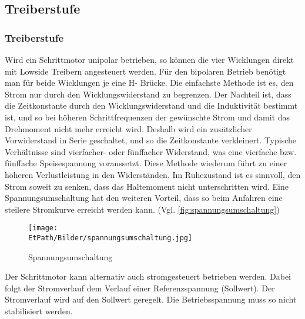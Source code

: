 \ifSTANDALONE
\subsection{Treiberstufe}
\fi
\ifEMBED
\subsubsection{Treiberstufe}
\fi 
	Wird ein Schrittmotor unipolar betrieben, so können die vier Wicklungen 
    direkt mit Lowside Treibern angesteuert werden. Für den bipolaren 
    Betrieb benötigt man für beide Wicklungen je eine H- Brücke. Die 
    einfachste Methode ist es, den Strom nur durch den Wicklungswiderstand 
    zu begrenzen. Der Nachteil ist, dass die Zeitkonstante durch den 
    Wicklungswiderstand und die Induktivität bestimmt ist, und so bei 
    höheren Schrittfrequenzen der gewünschte Strom und damit das 
    Drehmoment nicht mehr erreicht wird. Deshalb wird ein zusätzlicher 
    Vorwiderstand in Serie geschaltet, und so die Zeitkonstante 
    verkleinert. Typische Verhältnisse sind vierfacher- oder fünffacher 
    Widerstand, was eine vierfache bzw. fünffache Speisespannung 
    voraussetzt. Diese Methode wiederum führt zu einer höheren 
    Verlustleistung in den Widerständen. Im Ruhezustand ist es sinnvoll, 
    den Strom soweit zu senken, dass das Haltemoment nicht unterschritten 
    wird. Eine Spannungsumschaltung hat den weiteren Vorteil, dass so beim 
    Anfahren eine steilere Stromkurve erreicht werden kann. (Vgl. 
    \autoref{fig:spannungsumschaltung})
	 \begin{figure}[h!]
	 	\centering
	 	\texttt{[image: \\EtPath/Bilder/spannungsumschaltung.jpg]}
	 	\caption[Spannungsumschaltung]{Spannungsumschaltung \cite{AppNote:Stepper}}
	 	\label{fig:spannungsumschaltung}
	 \end{figure}
	Der Schrittmotor kann alternativ auch stromgesteuert betrieben werden. 
    Dabei folgt der Stromverlauf dem Verlauf einer Referenzspannung 
    (Sollwert). Der Stromverlauf wird auf den Sollwert geregelt. Die 
    Betriebsspannung muss so nicht stabilisiert werden. 
    \label{stromgesteuert} 

